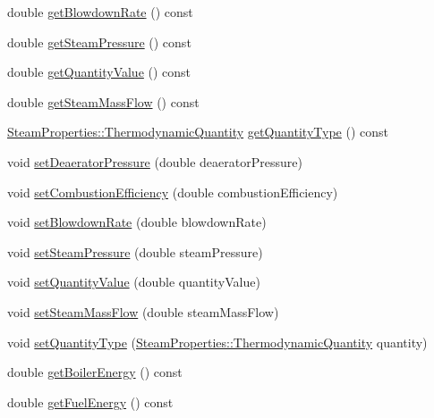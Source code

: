 \begin{DoxyCompactItemize}
\item 
double \hyperlink{class_boiler_aec9bf6eeed82d8d5f35284c65a3986e7}{get\+Blowdown\+Rate} () const
\item 
double \hyperlink{class_boiler_a99d4bbace6ef20bcbdc4b0cfcdc43213}{get\+Steam\+Pressure} () const
\item 
double \hyperlink{class_boiler_a78370a174135e6cc95abcd3b7ac2f947}{get\+Quantity\+Value} () const
\item 
double \hyperlink{class_boiler_a4101e71234995558a451dcab145b5fc9}{get\+Steam\+Mass\+Flow} () const
\item 
\hyperlink{class_steam_properties_ae0294bedf7d178c2d8fb6aed0f62fbff}{Steam\+Properties\+::\+Thermodynamic\+Quantity} \hyperlink{class_boiler_a26a71f789c9f9e05bd43a1ca0219f920}{get\+Quantity\+Type} () const
\item 
void \hyperlink{class_boiler_a56f422254606ebba1248ae0b4f8f0215}{set\+Deaerator\+Pressure} (double deaerator\+Pressure)
\item 
void \hyperlink{class_boiler_abef6bc48101f98f0650cb07fb1d51f74}{set\+Combustion\+Efficiency} (double combustion\+Efficiency)
\item 
void \hyperlink{class_boiler_a66c0e4c577dbd3f52dcf202e69a08371}{set\+Blowdown\+Rate} (double blowdown\+Rate)
\item 
void \hyperlink{class_boiler_a0a4619ff73c9969daebe3aa66ddad6be}{set\+Steam\+Pressure} (double steam\+Pressure)
\item 
void \hyperlink{class_boiler_ac3450d88dba124529d59baf62c39e14a}{set\+Quantity\+Value} (double quantity\+Value)
\item 
void \hyperlink{class_boiler_ada7af5896a2a4701d78a532dc9bc9892}{set\+Steam\+Mass\+Flow} (double steam\+Mass\+Flow)
\item 
void \hyperlink{class_boiler_a9c5b20cae6133c9174b12760f36d52c2}{set\+Quantity\+Type} (\hyperlink{class_steam_properties_ae0294bedf7d178c2d8fb6aed0f62fbff}{Steam\+Properties\+::\+Thermodynamic\+Quantity} quantity)
\item 
double \hyperlink{class_boiler_a8cc9ad5f1b36f5dcbcb225e9e3d13a39}{get\+Boiler\+Energy} () const
\item 
double \hyperlink{class_boiler_a55542a761669c842163b20932f9747d3}{get\+Fuel\+Energy} () const
\end{DoxyCompactItemize}
